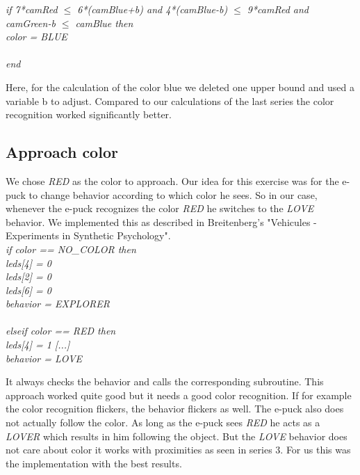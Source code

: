 \documentclass[a4paper]{article}
\begin{document}
			\textit
			{
				if 7*camRed $\leq$ 6*(camBlue+b) and 4*(camBlue-b) $\leq$ 9*camRed and\\
	   \indent \indent camGreen-b $\leq$ camBlue then\\
		\indent \indent \indent color = BLUE\\ \indent [...]\\ \indent end\\			
			}
			
			\noindent Here, for the calculation of the color blue we deleted one upper bound and 
			used a variable b to adjust. Compared to our calculations of the last series the color 
			recognition worked significantly better.
			 
		\newpage							
		\subsection{Approach color}
		\noindent We chose \textit{RED} as the color to approach. Our idea for this exercise was 
		for the e-puck to change behavior according to which	color he sees. So in our case, 
		whenever the e-puck recognizes the color \textit{RED} he switches to the \textit{LOVE} 
		behavior. We implemented this as described in Breitenberg's "Vehicules - Experiments in 
		Synthetic Psychology".\\ 
		
		\textit
		{
			if color ==  NO\_COLOR  then\\ \indent \indent leds[4] = 0\\ \indent \indent leds[2] = 
			0\\ \indent \indent leds[6] = 0\\ \indent \indent behavior = EXPLORER\\ \\ \indent
			elseif color == RED then\\ \indent \indent leds[4] = 1 [...]\\ \indent \indent
			behavior = LOVE\\
		}
		
		\noindent It always checks the behavior and calls the corresponding subroutine. This 
		approach worked quite good but it needs a good color recognition. If for example the color 
		recognition flickers, the behavior flickers as well. The e-puck also does not actually 
		follow the color. As long as the e-puck sees \textit{RED} he acts as a \textit{LOVER} 
		which results in him following the object. But the \textit{LOVE} behavior does not care 
		about color it works with proximities as seen in series 3. For us this was the 
		implementation with the best results.\\
		
\end{document}
